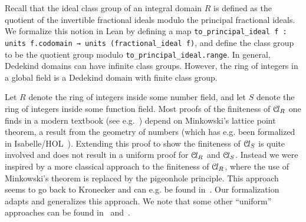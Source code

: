 \documentclass[a4paper,USenglish,cleveref, autoref, thm-restate]{lipics-v2021}
\newcommand{\lean}[1]{\texttt{#1}\xspace} %
\newcommand*{\Cl}{\mathcal{C}\kern-.075em l}
\newcommand{\mathlib}{\textsf{mathlib}\xspace}
\begin{document}
Recall that the ideal class group of an integral domain $R$ is defined as the quotient of the invertible fractional ideals modulo the principal fractional ideals.
We formalize this notion in Lean by defining a map \lean{to\_principal\_ideal f : units f.codomain → units (fractional\_ideal f)}, %
and define the class group to be the quotient group modulo \lean{to\_principal\_ideal.range}.
In general, Dedekind domains can have infinite class groups. However, the ring of integers in a global field is a Dedekind domain with finite class group.

Let $R$ denote the ring of integers inside some number field, and let $S$ denote the ring of integers inside some function field.
Most proofs of the finiteness of $\Cl_R$ one finds in a modern textbook (see e.g.~\cite[Theorems 4.4, 5.3, 6.3]{Neukirch}) depend on Minkowski's lattice point theorem, a result from the geometry of numbers (which has e.g. been formalized in Isabelle/HOL~\cite{Minkowskis_Theorem-AFP}).
Extending this proof to show the finiteness of $\Cl_S$ is quite involved and does not result in a uniform proof for $\Cl_R$ and $\Cl_S$.
Instead we were inspired by a more classical approach to the finiteness of $\Cl_R$, where the use of Minkowski's theorem is replaced by the pigeonhole principle. This approach seems to go back to Kronecker
and can e.g. be found in~\cite{Ireland-Rosen}.
Our formalization adapts and generalizes this approach.
We note that some other ``uniform'' approaches can be found in~\cite{Artin-Whaples} and~\cite{Stasinski}.
\end{document}
